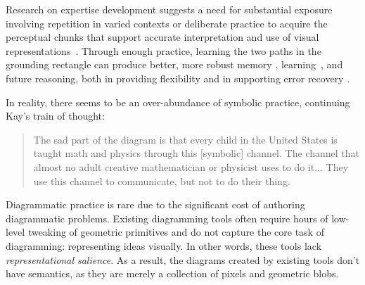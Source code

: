 Research on expertise development suggests a need for substantial exposure involving repetition in varied contexts or deliberate practice \cite{deliberatePractice} to acquire the perceptual chunks \cite{chunkingModels, perceptualLearningExpertise} that support accurate interpretation and use of visual representations~\cite{Koedinger1990a}. Through enough practice, learning the two paths in the grounding rectangle can produce better, more robust memory \cite{dualCoding}, learning~\cite{multipleReps, multimediaLearning, cotraining}, and future reasoning, both in providing flexibility and in supporting error recovery \cite{groundedAndAbstractReps}.

In reality, there seems to be an over-abundance of symbolic practice, continuing Kay's train of thought:

\begin{quote}
    The sad part of the diagram is that every child in the United States is taught math and physics through this [symbolic] channel. The channel that almost no adult creative mathematician or physicist uses to do it... They use this channel to communicate, but not to do their thing.
\end{quote}

Diagrammatic practice is rare due to the significant cost of authoring diagrammatic problems. Existing diagramming tools often require hours of low-level tweaking of geometric primitives and do not capture the core task of diagramming: representing ideas visually. In other words, these tools lack \emph{representational salience}. As a result, the diagrams created by existing tools don't have semantics, as they are merely a collection of pixels and geometric blobs.  



